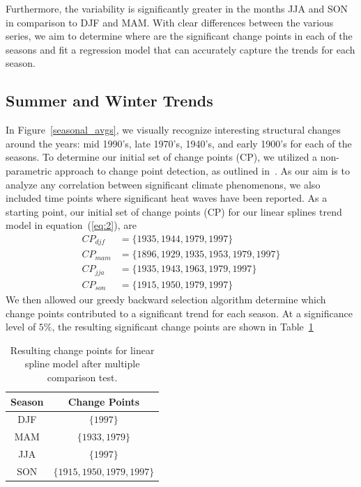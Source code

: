 \documentclass[12pt]{article}
\begin{document}
Furthermore, the variability is significantly greater in the months JJA and SON in comparison to DJF and MAM. With clear differences between the various series, we aim to determine where are the significant change points in each of the seasons and fit a regression model that can accurately capture the trends for each season.


\subsection{Summer and Winter Trends}
In Figure~\ref{seasonal_avgs}, we visually recognize interesting structural changes around the years: mid 1990's, late 1970's, 1940's, and early 1900's for each of the seasons. To determine our initial set of change points (CP), we utilized a non-parametric approach to change point detection, as outlined in~\citep{cps}. As our aim is to analyze any correlation between significant climate phenomenons, we also included time points where significant heat waves have been reported. As a starting point, our initial set of change points (CP) for our linear splines trend model in equation~(\ref{eq:2}), are
\begin{align*}
CP_{djf} &= \{1935, 1944, 1979, 1997\} \\
CP_{mam} &= \{1896, 1929, 1935, 1953, 1979, 1997\} \\
CP_{jja} &= \{1935, 1943, 1963,1979, 1997\} \\
CP_{son} &= \{1915, 1950, 1979, 1997\}
\end{align*}
We then allowed our greedy backward selection algorithm determine which change points contributed to a significant trend for each season. At a significance level of $5\%$, the resulting significant change points are shown in Table~\ref{my_cps}

\begin{table}[!htb]
\centering
\begin{tabular}{|c|c|}
\hline
\textbf{Season}       & \textbf{Change Points} \\ \hline\hline
DJF & $\{1997\}$ \\ \hline
MAM & $\{1933, 1979\}$ \\ \hline
JJA & $\{1997\}$ \\ \hline
SON & $\{1915, 1950, 1979, 1997\}$ \\ \hline
\end{tabular}
\caption{Resulting change points for linear spline model after multiple comparison test.}\label{my_cps}
\end{table}
\end{document}
